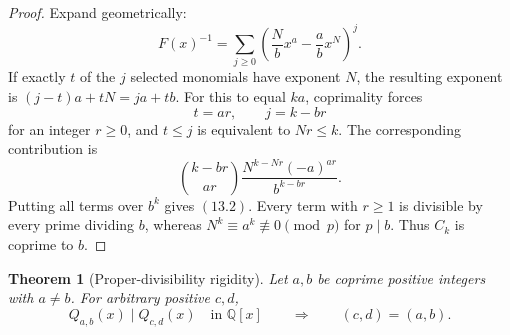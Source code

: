\documentclass[11pt]{article}
\newtheorem{theorem}{Theorem}[section]
\theoremstyle{definition}
\newcommand{\Q}{\mathbb Q}
\begin{document}
\begin{proof}
Expand geometrically:
\[
 F(x)^{-1}=\sum_{j\geq0}
 \left(\frac Nb x^a-\frac ab x^N\right)^j.
\]
If exactly \(t\) of the \(j\) selected monomials have exponent \(N\), the
resulting exponent is \((j-t)a+tN=ja+tb\).  For this to equal \(ka\),
coprimality forces
\[
 t=ar,\qquad j=k-br
\]
for an integer \(r\geq0\), and \(t\leq j\) is equivalent to \(Nr\leq k\).
The corresponding contribution is
\[
 \binom{k-br}{ar}\frac{N^{k-Nr}(-a)^{ar}}{b^{k-br}}.
\]
Putting all terms over \(b^k\) gives \((13.2)\).  Every term with \(r\geq1\)
is divisible by every prime dividing \(b\), whereas
\(N^k\equiv a^k\not\equiv0\pmod p\) for \(p\mid b\).  Thus \(C_k\) is
coprime to \(b\).
\end{proof}

\begin{theorem}[Proper-divisibility rigidity]\label{thm:nodivision}
Let \(a,b\) be coprime positive integers with \(a\neq b\).  For arbitrary
positive \(c,d\),
\begin{equation}
 Q_{a,b}(x)\mid Q_{c,d}(x)\quad\text{in }\Q[x]
 \qquad\Longrightarrow\qquad(c,d)=(a,b).
 \tag{13.3}
\end{equation}
\end{theorem}
\end{document}
